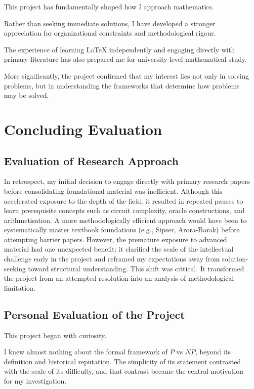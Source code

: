 \documentclass[12pt]{article}
\begin{document}
This project has fundamentally shaped how I approach mathematics.

Rather than seeking immediate solutions, I have developed a stronger appreciation for organizational constraints and methodological rigour.

The experience of learning LaTeX independently and engaging directly with primary literature has also prepared me for university-level mathematical study.

More significantly, the project confirmed that my interest lies not only in solving problems, but in understanding the frameworks that determine how problems may be solved.

\section{Concluding Evaluation}

\subsection{Evaluation of Research Approach}

In retrospect, my initial decision to engage directly with primary research papers before consolidating foundational material was inefficient.
Although this accelerated exposure to the depth of the field, it resulted in repeated pauses to learn prerequisite concepts such as circuit complexity, oracle constructions, and arithmetisation.
A more methodologically efficient approach would have been to systematically master textbook foundations (e.g., Sipser, Arora-Barak) before attempting barrier papers.
However, the premature exposure to advanced material had one unexpected benefit: it clarified the scale of the intellectual challenge early in the project and reframed my expectations away from solution-seeking toward structural understanding.
This shift was critical.
It transformed the project from an attempted resolution into an analysis of methodological limitation.

\subsection*{Personal Evaluation of the Project}

This project began with curiosity.

I knew almost nothing about the formal framework of $P$ vs $NP$, beyond its definition and historical reputation. The simplicity of its statement contrasted with the scale of its difficulty, and that contrast became the central motivation for my investigation.
\end{document}
